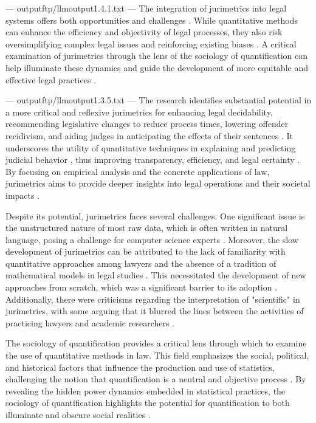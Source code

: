 ---
outputftp/llmoutput1.4.1.txt
---
The integration of jurimetrics into legal systems offers both opportunities and challenges \cite{citationkey1}. While quantitative methods can enhance the efficiency and objectivity of legal processes, they also risk oversimplifying complex legal issues and reinforcing existing biases \cite{citationkey2}. A critical examination of jurimetrics through the lens of the sociology of quantification can help illuminate these dynamics and guide the development of more equitable and effective legal practices \cite{citationkey3}.


---
outputftp/llmoutput1.3.5.txt
---
The research identifies substantial potential in a more critical and reflexive jurimetrics for enhancing legal decidability, recommending legislative changes to reduce process times, lowering offender recidivism, and aiding judges in anticipating the effects of their sentences \cite{nunes2018}. It underscores the utility of quantitative techniques in explaining and predicting judicial behavior \cite{luvizotto2020}, thus improving transparency, efficiency, and legal certainty \cite{silva2023}. By focusing on empirical analysis and the concrete applications of law, jurimetrics aims to provide deeper insights into legal operations and their societal impacts \cite{nunes2018}.

Despite its potential, jurimetrics faces several challenges. One significant issue is the unstructured nature of most raw data, which is often written in natural language, posing a challenge for computer science experts \cite{103390fi9040068}. Moreover, the slow development of jurimetrics can be attributed to the lack of familiarity with quantitative approaches among lawyers and the absence of a tradition of mathematical models in legal studies \cite{l2010de}. This necessitated the development of new approaches from scratch, which was a significant barrier to its adoption \cite{l2010de}. Additionally, there were criticisms regarding the interpretation of "scientific" in jurimetrics, with some arguing that it blurred the lines between the activities of practicing lawyers and academic researchers \cite{l2010de}.

The sociology of quantification provides a critical lens through which to examine the use of quantitative methods in law. This field emphasizes the social, political, and historical factors that influence the production and use of statistics, challenging the notion that quantification is a neutral and objective process \cite{10.1007/978-3-319-44000-215,10.3390/fi9040068}. By revealing the hidden power dynamics embedded in statistical practices, the sociology of quantification highlights the potential for quantification to both illuminate and obscure social realities \cite{10.1007/978-3-319-44000-215,10.3390/fi9040068}.

